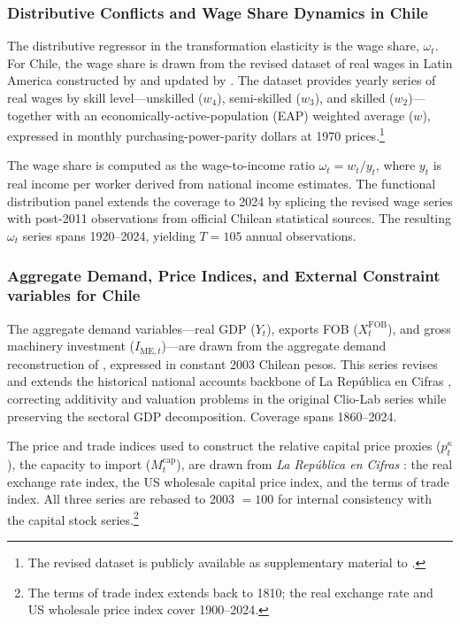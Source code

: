 \subsubsection{Distributive Conflicts and Wage Share Dynamics in Chile}

\label{sec:41x:chile_distrib}
The distributive regressor in the transformation elasticity is the
wage share, $\omega_t$. For Chile, the wage share is drawn from the
revised dataset of real wages in Latin America constructed by
\citet{Astorga2017} and updated by \citet{Astorga2023}. The dataset
provides yearly series of real wages by skill level---unskilled
($w_4$), semi-skilled ($w_3$), and skilled ($w_2$)---together with
an economically-active-population (EAP) weighted average ($w$),
expressed in monthly purchasing-power-parity dollars at 1970
prices.\footnote{The revised dataset is publicly available as
	supplementary material to \citet{Astorga2023}.}

The wage share is computed as the wage-to-income ratio
$\omega_t = w_t / y_t$, where $y_t$ is real income per worker
derived from national income estimates. The functional distribution
panel extends the \citet{Astorga2023} coverage to 2024 by splicing
the revised wage series with post-2011 observations from official
Chilean statistical sources. The resulting $\omega_t$ series spans
1920--2024, yielding $T = 105$ annual observations.

\subsubsection{Aggregate Demand, Price Indices, and External Constraint variables for Chile}
\label{sec:415:chile_demand}

The aggregate demand variables---real GDP ($Y_t$), exports FOB
($X^{\text{FOB}}_t$), and gross machinery investment
($I_{\text{ME},t}$)---are drawn from the aggregate demand
reconstruction of \citet{PerezEyzaguirre2019}, expressed in constant
2003 Chilean pesos. This series revises and extends the historical
national accounts backbone of La República en Cifras
\citep{LudersDiazWagner2016}, correcting additivity and valuation
problems in the original Clio-Lab series while preserving the
sectoral GDP decomposition. Coverage spans 1860--2024.

The price and trade indices used to construct the relative capital
price proxies ($p^{\kappa}_t$), the capacity to
import ($M^{\text{cap}}_t$), are drawn from \textit{La República en Cifras}
\citep{LudersDiazWagner2016}: the real exchange rate index, the US wholesale capital price index, and the
terms of trade index. All three series are rebased to
2003 $= 100$ for internal consistency with the capital stock
series.\footnote{The terms of trade index extends back to 1810;
	the real exchange rate and US wholesale price index cover
	1900--2024.}

